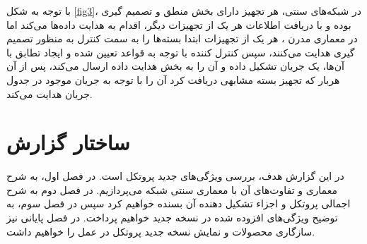 با توجه به شکل \ref{fig3}، در شبکه‌های سنتی، هر تجهیز دارای بخش منطق و تصمیم گیری بوده و با دریافت اطلاعات هر یک از تجهیزات دیگر، اقدام به هدایت داده‌ها می‌کند اما در معماری مدرن ، هر یک از تجهیزات ابتدا بسته‌ها را به سمت کنترل به منظور تصمیم گیری هدایت می‌کنند، سپس کنترل کننده با توجه به قواعد تعیین شده و ایجاد تطابق با آن‌ها، یک جریان تشکیل داده و آن را به بخش هدایت داده ارسال می‌کند، پس از آن هربار که تجهیز بسته مشابهی دریافت کرد آن را با توجه به جریان موجود در جدول جریان هدایت می‌کند.

\section{ساختار گزارش}
در این گزارش هدف، بررسی ویژگی‌های جدید پروتکل  است. در فصل اول، به شرح معماری  و تفاوت‌های آن با معماری سنتی شبکه می‌پردازیم. در فصل دوم به شرح اجمالی پروتکل  و اجزاء تشکیل دهنده آن بسنده خواهیم کرد سپس در فصل سوم، به توضیح ویژگی‌های افزوده شده در نسخه جدید  خواهیم پرداخت. در فصل پایانی نیز سازگاری محصولات و نمایش نسخه جدید پروتکل در عمل را خواهیم داشت.





